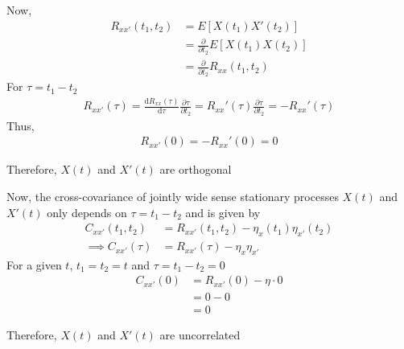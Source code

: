 \documentclass{beamer}
\providecommand{\mean}[1]{E\left[ #1 \right]}
\begin{document}
	\begin{frame}
	Now,
	\begin{align}
		R_{xx'}(t_1, t_2) &= \mean{X(t_1)X'(t_2)} \\
		&= \frac{\partial}{\partial t_2} \mean{X(t_1)X(t_2)} \\
		&= \frac{\partial}{\partial t_2} R_{xx}(t_1,t_2)
	\end{align}
	For $\tau = t_1 - t_2$
	\begin{align}
		R_{xx'}(\tau) = \frac{\mathrm{d}R_{xx}(\tau)}{\mathrm{d}\tau}  \frac{\partial \tau}{\partial t_2} = R_{xx}'(\tau) \frac{\partial \tau}{\partial t_2} = -R_{xx}'(\tau)
	\end{align}
	Thus, 
	\begin{align}
		R_{xx'}(0) = -R_{xx}'(0) = 0
	\end{align}

	\begin{alertblock}{Therefore,}
		$X(t)$ and $X'(t)$ are orthogonal
	\end{alertblock}
	\end{frame}

	\begin{frame}
	Now, the cross-covariance of jointly wide sense stationary processes $X(t)$ and $X'(t)$ only depends on $\tau = t_1-t_2$ and is given by
	\begin{align}
		C_{xx'}(t_1, t_2) &= R_{xx'}(t_1, t_2) - \eta_{x}(t_1) \eta_{x'}(t_2) \\
		\implies C_{xx'}(\tau) &= R_{xx'}(\tau) - \eta_{x} \eta_{x'}  
	\end{align}
	For a given $t$, $t_1 = t_2 = t$ and $\tau = t_1 - t_2 = 0$
	\begin{align}
		C_{xx'}(0) &= R_{xx'}(0) - \eta \cdot 0 \\
		&= 0 - 0 \\
		&= 0
	\end{align}
	
	\begin{alertblock}{Therefore,}
		$X(t)$ and $X'(t)$ are uncorrelated
	\end{alertblock}
	\end{frame}
	
\end{document}
